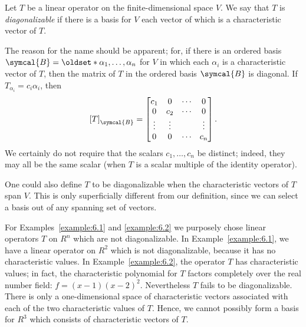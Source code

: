 \begin{definition}
    Let \(T\) be a linear operator on the finite-dimensional space \(V\). We say that \(T\) is \emph{diagonalizable} if there is a basis for \(V\) each vector of which is a characteristic vector of \(T\).
\end{definition}

The reason for the name should be apparent; for, if there is an ordered basis \(\symcal{B}=\set{\alpha_1,\ldots,\alpha_n}\) for \(V\) in which each \(\alpha_i\) is a characteristic vector of \(T\), then the matrix of \(T\) in the ordered basis \(\symcal{B}\) is diagonal. If \(T_{\alpha_i}=c_i\alpha_i\), then
\begin{equation*}
    \left[T\right]_{\symcal{B}}=
    \begin{bmatrix}
        c_1 & 0 & \cdots & 0 \\
        0 & c_2 & \cdots & 0 \\
        \vdots & \vdots && \vdots \\
        0 & 0 & \cdots & c_n
    \end{bmatrix}
    .
\end{equation*}
We certainly do not require that the scalars \(c_1,\ldots,c_n\) be distinct; indeed, they may all be the same scalar (when \(T\) is a scalar multiple of the identity operator).

One could also define \(T\) to be diagonalizable when the characteristic vectors of \(T\) span \(V\). This is only superficially different from our definition, since we can select a basis out of any spanning set of vectors.

For Examples~\ref{example:6.1} and \ref{example:6.2} we purposely chose linear operators \(T\) on \(R^n\) which are not diagonalizable. In Example~\ref{example:6.1}, we have a linear operator on \(R^2\) which is not diagonalizable, because it has no characteristic values. In Example~\ref{example:6.2}, the operator \(T\) has characteristic values; in fact, the characteristic polynomial for \(T\) factors completely over the real number field: \(f=\left(x-1\right)\left(x-2\right)^2\). Nevertheless \(T\) fails to be diagonalizable. There is only a one-dimensional space of characteristic vectors associated with each of the two characteristic values of \(T\). Hence, we cannot possibly form a basis for \(R^3\) which consists of characteristic vectors of \(T\).

